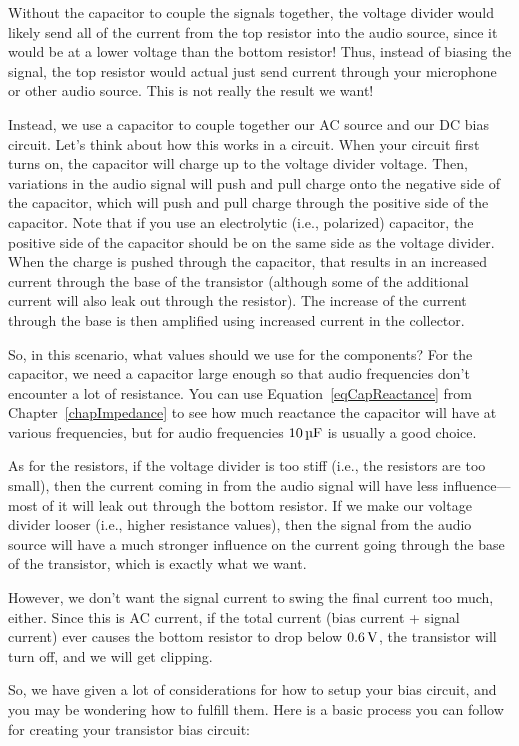 Without the capacitor to couple the signals together, the voltage divider would likely send all of the current from the top resistor into the audio source, since it would be at a lower voltage than the bottom resistor!
Thus, instead of biasing the signal, the top resistor would actual just send current through your microphone or other audio source.
This is not really the result we want!

Instead, we use a capacitor to couple together our AC source and our DC bias circuit.
Let's think about how this works in a circuit.
When your circuit first turns on, the capacitor will charge up to the voltage divider voltage.
Then, variations in the audio signal will push and pull charge onto the negative side of the capacitor, which will push and pull charge through the positive side of the capacitor.
Note that if you use an electrolytic (i.e., polarized) capacitor, the positive side of the capacitor should be on the same side as the voltage divider.
When the charge is pushed through the capacitor, that results in an increased current through the base of the transistor (although some of the additional current will also leak out through the resistor).
The increase of the current through the base is then amplified using increased current in the collector.

So, in this scenario, what values should we use for the components?
For the capacitor, we need a capacitor large enough so that audio frequencies don't encounter a lot of resistance.
You can use Equation~\ref{eqCapReactance} from Chapter~\ref{chapImpedance} to see how much reactance the capacitor will have at various frequencies, but for audio frequencies $10\,\si{\micro\farad}$ is usually a good choice.

As for the resistors, if the voltage divider is too stiff (i.e., the resistors are too small), then the current coming in from the audio signal will have less influence---most of it will leak out through the bottom resistor.
If we make our voltage divider looser (i.e., higher resistance values), then the signal from the audio source will have a much stronger influence on the current going through the base of the transistor, which is exactly what we want.

However, we don't want the signal current to swing the final current too much, either.
Since this is AC current, if the total current (bias current + signal current) ever causes the bottom resistor to drop below $0.6\,\si{\volt}$, the transistor will turn off, and we will get clipping.

So, we have given a lot of considerations for how to setup your bias circuit, and you may be wondering how to fulfill them.
Here is a basic process you can follow for creating your transistor bias circuit:


